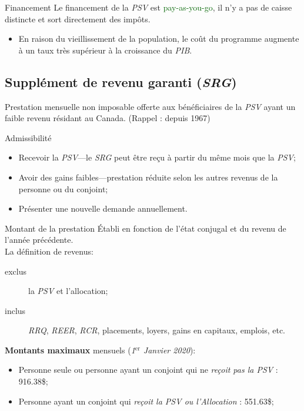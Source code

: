 \documentclass[10pt, french]{article}
\begin{document}
\begin{multicols*}{3}
\begin{conceptgen}{Financement}
Le financement de la \textit{PSV} est \textcolor{darkgreen}{pay-as-you-go}, il n'y a pas de caisse distincte et sort directement des impôts.
\begin{itemize}[leftmargin = *]
	\item En raison du vieillissement de la population, le coût du programme augmente à un taux très supérieur à la croissance du \textit{PIB}.
\end{itemize}
\end{conceptgen}

\columnbreak

\subsection{Supplément de revenu garanti (\textit{SRG})}
\label{sec:SRG}
\begin{definitionNOHFILL}[Définition]
Prestation mensuelle non imposable offerte aux bénéficiaires de la \textit{PSV} ayant un faible revenu résidant au Canada. (Rappel : depuis 1967)
\end{definitionNOHFILL}

\begin{conceptgen}{Admissibilité}
\begin{itemize}[leftmargin = *]
	\item	Recevoir la \textit{PSV}---le \textit{SRG} peut être reçu à partir du même mois que la \textit{PSV};
	\item	Avoir des gains faibles---prestation réduite selon les autres revenus de la personne ou du conjoint;
	\item	Présenter une nouvelle demande annuellement.
\end{itemize}
\end{conceptgen}

\begin{conceptgen}{Montant de la prestation}
Établi en fonction de l'état conjugal et du revenu de l'année précédente.\\

La définition de revenus:
\begin{description}
	\item[exclus]	la \textit{PSV} et l'allocation;
	\item[inclus]	\textit{RRQ}, \textit{REER}, \textit{RCR}, placements, loyers, gains en capitaux, emplois, etc.
\end{description}

\textbf{Montants maximaux} mensuels (\textit{1$^{\text{er}}$ Janvier 2020}):
\begin{itemize}[leftmargin = *]
	\item	Personne seule ou personne ayant un conjoint qui ne \textit{reçoit pas la PSV} : 916.38\$;
	\item	Personne ayant un conjoint qui \textit{reçoit la PSV ou l'Allocation} : 551.63\$;
\end{itemize}


\end{conceptgen}
\end{multicols*}
\end{document}
